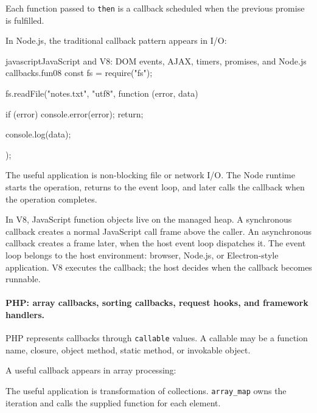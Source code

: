 \documentclass[a4paper,twoside]{report}
\begin{document}
Each function passed to \texttt{then} is a callback scheduled when the previous promise is fulfilled.

In Node.js, the traditional callback pattern appears in I/O:

\begin{codebox}[]{javascript}{JavaScript and V8: DOM events, AJAX, timers, promises, and Node.js callbacks.}{fun08}
const fs = require("fs");

fs.readFile("notes.txt", "utf8", function (error, data) {
    if (error) {
        console.error(error);
        return;
    }

    console.log(data);
});
\end{codebox}


The useful application is non-blocking file or network I/O. The Node runtime starts the operation, returns to the event loop, and later calls the callback when the operation completes.

In V8, JavaScript function objects live on the managed heap. A synchronous callback creates a normal JavaScript call frame above the caller. An asynchronous callback creates a frame later, when the host event loop dispatches it. The event loop belongs to the host environment: browser, Node.js, or Electron-style application. V8 executes the callback; the host decides when the callback becomes runnable.

\paragraph{PHP: array callbacks, sorting callbacks, request hooks, and framework handlers.}

PHP represents callbacks through \texttt{callable} values. A callable may be a function name, closure, object method, static method, or invokable object.

A useful callback appears in array processing:



The useful application is transformation of collections. \texttt{array\_map} owns the iteration and calls the supplied function for each element.
\end{document}
